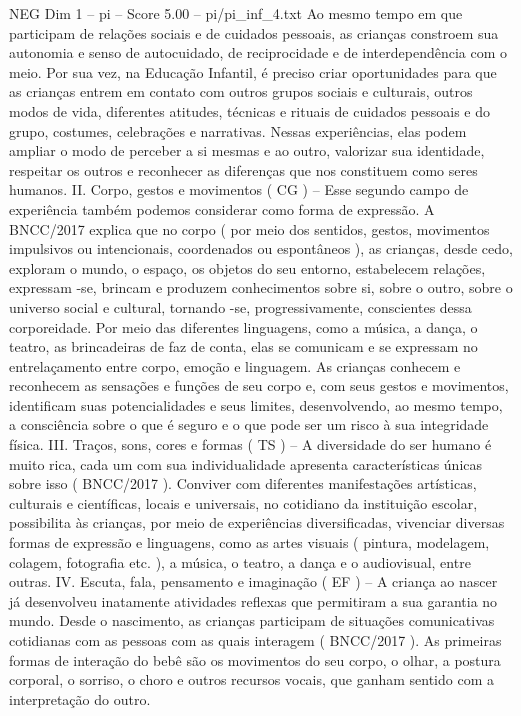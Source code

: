 \begin{textsample}{NEG Dim 1 – pi – Score 5.00 – pi/pi\_inf\_4.txt}
Ao mesmo tempo em que participam de relações sociais e de cuidados pessoais, as crianças constroem sua autonomia e senso de autocuidado, de reciprocidade e de interdependência com o meio.
Por sua vez, na Educação Infantil, é preciso criar oportunidades para que as crianças entrem em contato com outros grupos sociais e culturais, outros modos de vida, diferentes atitudes, técnicas e rituais de cuidados pessoais e do grupo, costumes, celebrações e narrativas.
Nessas experiências, elas podem ampliar o modo de perceber a si mesmas e ao outro, valorizar sua identidade, respeitar os outros e reconhecer as diferenças que nos constituem como seres humanos.
II.
Corpo, gestos e movimentos ( CG ) – Esse segundo campo de experiência também podemos considerar como forma de expressão.
A BNCC/2017 explica que no corpo ( por meio dos sentidos, gestos, movimentos impulsivos ou intencionais, coordenados ou espontâneos ), as crianças, desde cedo, exploram o mundo, o espaço, os objetos do seu entorno, estabelecem relações, expressam -se, brincam e produzem conhecimentos sobre si, sobre o outro, sobre o universo social e cultural, tornando -se, progressivamente, conscientes dessa corporeidade.
Por meio das diferentes linguagens, como a música, a dança, o teatro, as brincadeiras de faz de conta, elas se comunicam e se expressam no entrelaçamento entre corpo, emoção e linguagem.
As crianças conhecem e reconhecem as sensações e funções de seu corpo e, com seus gestos e movimentos, identificam suas potencialidades e seus limites, desenvolvendo, ao mesmo tempo, a consciência sobre o que é seguro e o que pode ser um risco à sua integridade física.
III.
Traços, sons, cores e formas ( TS ) – A diversidade do ser humano é muito rica, cada um com sua individualidade apresenta características únicas sobre isso ( BNCC/2017 ).
Conviver com diferentes manifestações artísticas, culturais e científicas, locais e universais, no cotidiano da instituição escolar, possibilita às crianças, por meio de experiências diversificadas, vivenciar diversas formas de expressão e linguagens, como as artes visuais ( pintura, modelagem, colagem, fotografia etc. ), a música, o teatro, a dança e o audiovisual, entre outras.
IV.
Escuta, fala, pensamento e imaginação ( EF ) – A criança ao nascer já desenvolveu inatamente atividades reflexas que permitiram a sua garantia no mundo.
Desde o nascimento, as crianças participam de situações comunicativas cotidianas com as pessoas com as quais interagem ( BNCC/2017 ).
As primeiras formas de interação do bebê são os movimentos do seu corpo, o olhar, a postura corporal, o sorriso, o choro e outros recursos vocais, que ganham sentido com a interpretação do outro.

\end{textsample}

